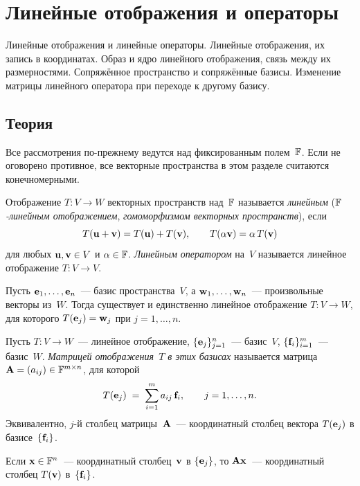 
\section{Линейные отображения и операторы}
\label{sec:1.1.05-linear-maps}

\begin{ticket}
Линейные отображения и линейные операторы. Линейные отображения, их запись в координатах. Образ и ядро линейного отображения, связь между их размерностями. Сопряжённое пространство и сопряжённые базисы. Изменение матрицы линейного оператора при переходе к другому базису.
\end{ticket}

\subsection*{Теория}

Все рассмотрения по-прежнему ведутся над фиксированным полем~$\mathbb{F}$. Если
не оговорено противное, все векторные пространства в этом разделе
считаются конечномерными.

\begin{definition}
\label{def:linear-map}
Отображение $T \colon V \to W$ векторных пространств над~$\mathbb{F}$
называется \emph{линейным} (\emph{$\mathbb{F}$-линейным отображением},
\emph{гомоморфизмом векторных пространств}), если
\[
  T(\mathbf{u} + \mathbf{v}) = T(\mathbf{u}) + T(\mathbf{v}), \qquad
  T(\alpha \mathbf{v}) = \alpha\, T(\mathbf{v})
\]
для любых $\mathbf{u}, \mathbf{v} \in V$ и $\alpha \in \mathbb{F}$. \emph{Линейным
оператором} на~$V$ называется линейное отображение $T \colon V \to V$.
\end{definition}

\begin{theorem}
\label{thm:lin-determined-by-basis}
Пусть $\mathbf{e}_1, \dots, \mathbf{e}_n$~--- базис пространства~$V$, а
$\mathbf{w}_1, \dots, \mathbf{w}_n$~--- произвольные векторы из~$W$. Тогда
существует и единственно линейное отображение $T \colon V \to W$, для
которого $T(\mathbf{e}_j) = \mathbf{w}_j$ при $j = 1, \dots, n$.
\end{theorem}

\begin{definition}
\label{def:matrix-of-linear-map}
Пусть $T \colon V \to W$~--- линейное отображение,
$\{\mathbf{e}_j\}_{j=1}^{n}$~--- базис~$V$, $\{\mathbf{f}_i\}_{i=1}^{m}$~---
базис~$W$. \emph{Матрицей отображения~$T$ в этих базисах} называется
матрица $\mathbf{A} = (a_{ij}) \in \mathbb{F}^{m \times n}$, для которой
\[
  T(\mathbf{e}_j) \;=\; \sum_{i=1}^{m} a_{ij}\,\mathbf{f}_i,
  \qquad j = 1, \dots, n.
\]
Эквивалентно, $j$-й столбец матрицы~$\mathbf{A}$~--- координатный столбец
вектора $T(\mathbf{e}_j)$ в базисе~$\{\mathbf{f}_i\}$.

Если $\mathbf{x} \in \mathbb{F}^n$~--- координатный столбец~$\mathbf{v}$ в
$\{\mathbf{e}_j\}$, то $\mathbf{A}\mathbf{x}$~--- координатный столбец
$T(\mathbf{v})$ в~$\{\mathbf{f}_i\}$.
\end{definition}

